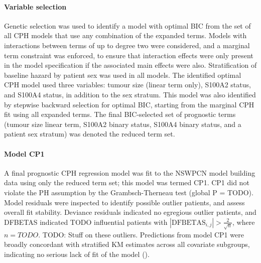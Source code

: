 \documentclass[dissertation.tex]{subfiles}
\begin{document}
\paragraph{Variable selection}
Genetic selection was used to identify a model with optimal \gls{BIC} from the set of all \gls{CPH} models that use any combination of the expanded terms.  Models with interactions between terms of up to degree two were considered, and a marginal term constraint was enforced, to ensure that interaction effects were only present in the model specification if the associated main effects were also.  Stratification of baseline hazard by patient sex was used in all models.  The identified optimal \gls{CPH} model used three variables: tumour size (linear term only), S100A2 status, and S100A4 status, in addition to the sex stratum.  This model was also identified by stepwise backward selection for optimal BIC, starting from the marginal \gls{CPH} fit using all expanded terms.  The final \gls{BIC}-selected set of prognostic terms (tumour size linear term, S100A2 binary status, S100A4 binary status, and a patient sex stratum) was denoted the reduced term set.

\paragraph{Model CP1}
A final prognostic \acrshort{CPH} regression model was fit to the \gls{NSWPCN} model building data using only the reduced term set; this model was termed CP1.  CP1 did not violate the \gls{PH} assumption by the Grambsch-Therneau test (global P = TODO).  Model residuals were inspected to identify possible outlier patients, and assess overall fit stability.  Deviance residuals indicated no egregious outlier patients, and DFBETAS indicated TODO influential patients with $|\mbox{DFBETAS}_{i,j}| > \frac{2}{\sqrt{n}}$, where $n = TODO$.  TODO: Stuff on these outliers.  Predictions from model CP1 were broadly concordant with stratified \gls{KM} estimates across all covariate subgroups, indicating no serious lack of fit of the model ().
\end{document}
